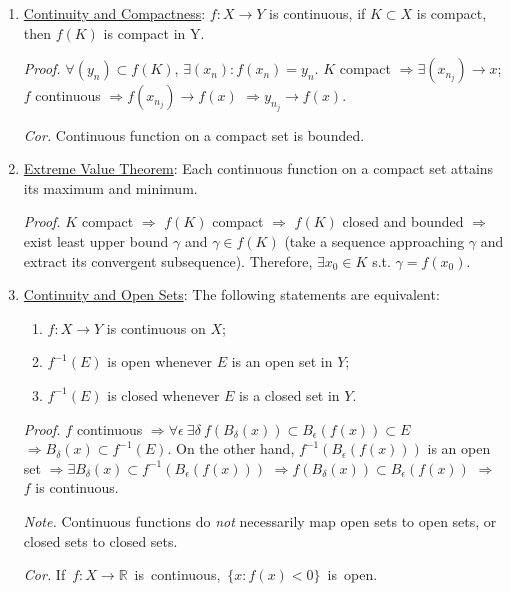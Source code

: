 \documentclass[%
 aip,
 jmp,%
 amsmath,amssymb,
 reprint,%
]{revtex4-1}
\def\R{{\mathbb R}}
\def\d{\delta}
\def\e{\epsilon}
\renewenvironment{proof}{\color{gray}\footnotesize\emph{Proof.}}{}
\newcommand{\imply}{\Rightarrow}
\newcommand{\defn}[1]{\underline{#1}}
\begin{document}
\begin{enumerate}
  \item \defn{Continuity and Compactness}:  $f: X \to Y$ is continuous,
  if $K \subset X$ is compact, then $f(K)$ is compact in Y.

      \begin{proof}
        $\forall (y_n) \subset f(K)$, $\exists (x_n): f(x_n)=y_n$.
        $K$ compact $\imply \exists (x_{n_j}) \to x$;
        $f$ continuous $\imply f(x_{n_j}) \to f(x)$ $\imply y_{n_j} \to f(x)$.
      \end{proof}

      \emph{Cor.} Continuous function on a compact set is bounded.


  \item \defn{Extreme Value Theorem}: Each continuous function on a compact
  set attains its maximum and minimum.

      \begin{proof}
        $K$ compact $\imply$ $f(K)$ compact $\imply$ $f(K)$ closed and bounded
        $\imply$ exist least upper bound $\gamma$ and $\gamma \in f(K)$
        (take a sequence approaching $\gamma$ and extract its convergent
        subsequence). Therefore, $\exists x_0 \in K$ s.t. $\gamma=f(x_0)$.
      \end{proof}

  \item \defn{Continuity and Open Sets}: The following statements are equivalent:
      \begin{enumerate}
        \item $f: X \to Y$ is continuous on $X$;
        \item $f^{-1}(E)$ is open whenever $E$ is an open set in $Y$;
        \item $f^{-1}(E)$ is closed whenever $E$ is a closed set in $Y$.
      \end{enumerate}
      \begin{proof}
        $f$ continuous $\imply \forall\e\ \exists\d\ f(B_{\d}(x)) \subset B_{\e}(f(x)) \subset E$
        $\imply B_{\d}(x) \subset f^{-1}(E)$.
        On the other hand, $f^{-1}(B_{\e}(f(x)))$ is an open set
        $\imply \exists B_{\d}(x) \subset f^{-1}(B_{\e}(f(x)))$
        $\imply f(B_{\d}(x)) \subset B_{\e}(f(x))$ $\imply$ $f$ is continuous.
      \end{proof}

      \emph{Note.} Continuous functions do \emph{not} necessarily
      map open sets to open sets, or closed sets to closed sets.

      \emph{Cor.} \mbox{If $f: X\to\R$ is continuous, $\{x: f(x)<0\}$ is open.}


\end{enumerate}
\end{document}

